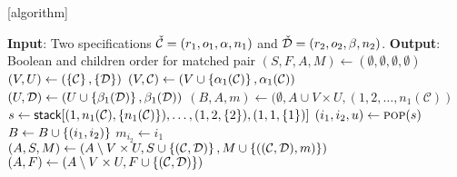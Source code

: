 \makeatletter
{}[algorithm]
\newlength{\phaserulewidth}
\newcommand{\setphaserulewidth}{\setlength{\phaserulewidth}}
\newcommand{\phase}[1]{%
  \vspace{-1.25ex}
  \Statex\leavevmode\llap{\rule{\dimexpr\labelwidth+\labelsep}{\phaserulewidth}}\rule{\linewidth}{\phaserulewidth}
  \Statex\strut\refstepcounter{phase}\textit{Phase~\thephase~--~#1}%
  \vspace{-1.25ex}\Statex\leavevmode\llap{\rule{\dimexpr\labelwidth+\labelsep}{\phaserulewidth}}\rule{\linewidth}{\phaserulewidth}}
\makeatother

\setphaserulewidth{.7pt}

\begin{algorithmic}[1]
\Statex \textbf{Input}: Two specifications $\check{\mathcal{C}} = (r_1,o_1,\alpha,n_1)$ and $\check{\mathcal{D}} = (r_2,o_2,\beta,n_2)$.
\Statex \textbf{Output}: Boolean and children order for matched pair
\State $(S,F,A,M) \gets (\emptyset,\emptyset,\emptyset,\emptyset)$ 
        \State{}
    \EndIf
        \State{}
    \EndIf
    \State $(V,U) \gets \left(\left\{\mathcal{C}\right\}, \left\{\mathcal{D}\right\}\right)$
        \State $\left(V, \mathcal{C}\right) \gets \left(V \cup \left\{\alpha_1(\mathcal{C})\right\}, \alpha_1(\mathcal{C})\right)$
    \EndWhile
        \State $\left(U, \mathcal{D}\right) \gets \left(U \cup \left\{\beta_1(\mathcal{D})\right\}, \beta_1(\mathcal{D})\right)$
    \EndWhile
        \State {}
    \EndIf
        \State {}
    \EndIf
    \State $(B,A,m) \gets (\emptyset, A \cup V \times U, (1,2,\ldots,n_1(\mathcal{C}))$
    \State $s \gets \textsf{stack}[(1,n_1(\mathcal{C}),\left\{n_1(\mathcal{C})\right\}),\dotsc,(1,2,\left\{2\right\}),(1,1,\left\{1\right\})]$
        \State $(i_1,i_2,u) \gets \Call{pop}{s}$
            \State $B \gets B \cup \left\{(i_1,i_2)\right\}$
            \State \algorithmiccontinue
        \EndIf
        \State $m_{i_2} \gets i_1$
            \State $(A,S,M) \gets \left(A \setminus V \times U, S \cup \left\{(\mathcal{C}, \mathcal{D})\right\}, M \cup \left\{((\mathcal{C}, \mathcal{D}), m)\right\}\right)$
            \State{}
        \EndIf
            \State {}
        \EndFor
    \EndWhile
    \State $(A, F) \gets \left(A \setminus V \times U, F \cup \left\{(\mathcal{C}, \mathcal{D})\right\}\right)$
    \State{}
\EndProcedure
\State{}
\end{algorithmic}